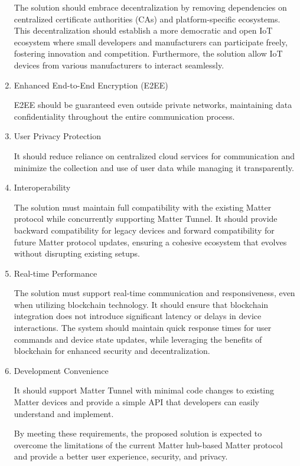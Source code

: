 \documentclass[conference]{IEEEtran}
\begin{document}
\begin{enumerate}[itemsep=2ex, parsep=1ex]
	      The solution should embrace decentralization by removing dependencies on centralized certificate authorities (CAs) and platform-specific ecosystems. This decentralization should establish a more democratic and open IoT ecosystem where small developers and manufacturers can participate freely, fostering innovation and competition. Furthermore, the solution allow IoT devices from various manufacturers to interact seamlessly.
	      
	\item Enhanced End-to-End Encryption (E2EE)
	      
	      E2EE should be guaranteed even outside private networks, maintaining data confidentiality throughout the entire communication process.
	      
	\item User Privacy Protection
	      
	      It should reduce reliance on centralized cloud services for communication and minimize the collection and use of user data while managing it transparently.
	      
	\item Interoperability
	      
	      The solution must maintain full compatibility with the existing Matter protocol while concurrently supporting Matter Tunnel. It should provide backward compatibility for legacy devices and forward compatibility for future Matter protocol updates, ensuring a cohesive ecosystem that evolves without disrupting existing setups.
	      
	\item Real-time Performance
	      
	      The solution must support real-time communication and responsiveness, even when utilizing blockchain technology. It should ensure that blockchain integration does not introduce significant latency or delays in device interactions. The system should maintain quick response times for user commands and device state updates, while leveraging the benefits of blockchain for enhanced security and decentralization.
	      
	\item Development Convenience
	      
	      It should support Matter Tunnel with minimal code changes to existing Matter devices and provide a simple API that developers can easily understand and implement.
	      
	      By meeting these requirements, the proposed solution is expected to overcome the limitations of the current Matter hub-based Matter protocol and provide a better user experience, security, and privacy.
	      
\end{enumerate}
\end{document}
